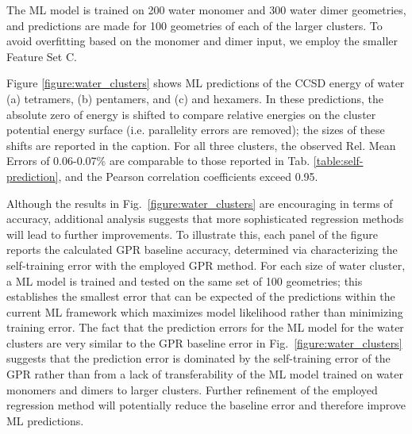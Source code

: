 \documentclass[%
 aps,
 prb,
 twocolumn,
%
 reprint,%
%
citeautoscript,
%
showkeys
]{revtex4-1}
\begin{document}
The ML model is trained on 200 water monomer and 300 water dimer geometries, and predictions are made for 100 geometries of each of the larger clusters.
To avoid overfitting based on the monomer and dimer input, we employ the smaller Feature Set C. 

%
%

Figure \ref{figure:water_clusters} shows ML predictions of the CCSD energy of water (a) tetramers, (b) pentamers, and (c) and hexamers. 
In these predictions, the absolute zero of energy is shifted to compare relative energies on the cluster potential energy surface (i.e. parallelity errors are removed); the sizes of these shifts are reported in the caption. 
%
For all three clusters, the observed Rel. Mean Errors of 0.06-0.07\% are comparable to those reported in Tab. \ref{table:self-prediction}, and the Pearson correlation coefficients exceed 0.95.  %

Although the results in Fig.~\ref{figure:water_clusters} are encouraging in terms of accuracy, additional analysis suggests that more sophisticated regression methods will lead to further improvements.  
To illustrate this, each panel of the figure reports the calculated GPR baseline accuracy, determined via characterizing the self-training error with the employed GPR method.  
For each size of water cluster, a ML model is trained and tested on the same set of 100 geometries; 
this establishes the smallest error that can be expected of the predictions within the current ML framework which maximizes model likelihood rather than minimizing training error. 
%
The fact that the prediction errors for the ML model for the water clusters are very similar to the GPR baseline error in Fig.~\ref{figure:water_clusters} suggests that the prediction error is dominated by the self-training error of the GPR rather than from a lack of transferability of the ML model trained on water monomers and dimers to larger clusters.
Further refinement of the employed regression method will potentially reduce the baseline error and therefore improve ML predictions.

%
%
%
%
%

%
%
%
%
%
%
%
%
%

%
%
%
%
%
%
%


%
%
%
%
%
%
%
%
%


%
%
%
%
%
%

%

%

%



%
\end{document}
